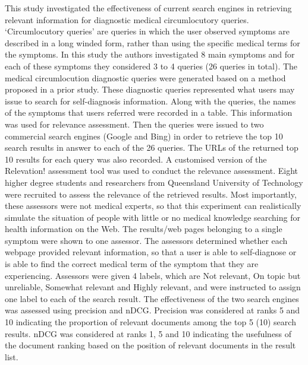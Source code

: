 \documentclass[]{article}
\begin{document}
This study investigated the effectiveness of current search engines in retrieving relevant information for diagnostic medical circumlocutory queries. ‘Circumlocutory queries’ are queries in which the user observed symptoms are described in a long winded form, rather than using the specific medical terms for the symptoms. In this study the authors investigated 8 main symptoms and for each of these symptoms they considered 3 to 4 queries (26 queries in total). The  medical circumlocution diagnostic queries were generated based on a method proposed in a prior study. These diagnostic queries represented  what users may issue to search for self-diagnosis information.  Along with the queries, the names of the symptoms that users referred were recorded in a table. This information was used for relevance assessment. Then the queries were issued to two commercial search engines (Google and Bing) in order to retrieve the top 10 search results in answer to each of the 26 queries. The URLs of the returned top 10 results for each query was also recorded. A customised version of the Relevation! assessment tool was used to conduct the relevance assessment. Eight higher degree students and researchers from Queensland University of Technology were recruited to assess the relevance of the retrieved results. Most importantly, these assessors were not medical experts, so that this experiment can realistically simulate the situation of people with little or no medical knowledge searching for health information on the Web. The results/web pages belonging to a single symptom were shown to one assessor. The assessors determined whether each webpage provided relevant information, so that a user is able to self-diagnose or is able to find the correct medical term of the symptom that they are experiencing. Assessors were given 4 labels, which are Not relevant, On topic but unreliable, Somewhat relevant and Highly relevant, and were instructed to assign one label to each of the search result. 
The effectiveness of the two search engines was assessed using precision and nDCG. Precision was considered at ranks 5 and 10 indicating the proportion of relevant documents among the top 5 (10) search results. nDCG was considered at ranks 1, 5 and 10 indicating the usefulness of the document ranking based on the position of relevant documents in the result list.
\end{document}
